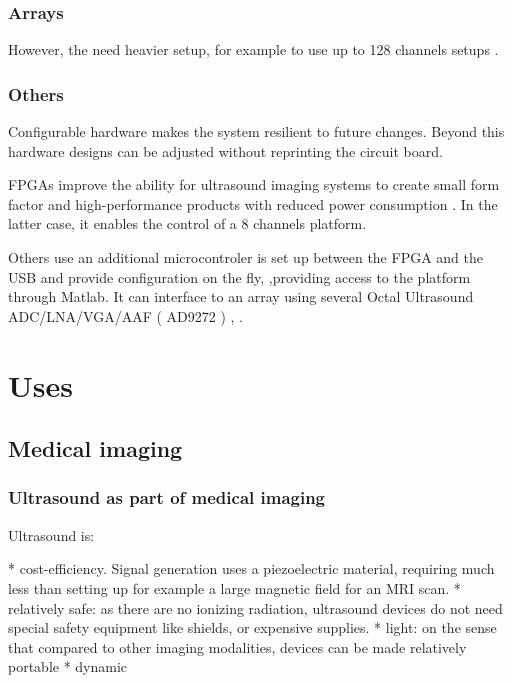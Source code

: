 \documentclass[conference]{IEEEtran}
\begin{document}
\subsubsection{Arrays}


However, the need heavier setup, for example to use up to 128 channels setups \cite{assef_flexible_2015}.

\subsubsection{Others}

Configurable hardware makes the system resilient to future changes.
Beyond this hardware designs can be adjusted without reprinting the circuit board.

FPGAs improve the ability for ultrasound imaging systems to create small form factor and high-performance products with reduced power consumption \cite{dusa_low_2014}. In the latter case, it enables the control of a 8 channels platform.
  
Others use  an  additional microcontroler is set up between the FPGA and the USB and provide configuration on the fly, ,providing access to the platform through Matlab. It can interface to an array using several Octal Ultrasound ADC/LNA/VGA/AAF ( AD9272 ) \cite{raj_microcontroller_2017}, \cite{raj_8051_2016}.

\section{Uses}

\subsection{Medical imaging}

\subsubsection{Ultrasound as part of medical imaging }

Ultrasound is:

* cost-efficiency. Signal generation uses a piezoelectric material, requiring much less than setting up for example a large magnetic field for an MRI scan. 
* relatively safe: as there are no ionizing radiation, ultrasound devices do not need special safety equipment like shields, or expensive supplies.
* light: on the sense that compared to other imaging modalities, devices can be made relatively portable
* dynamic
\end{document}
